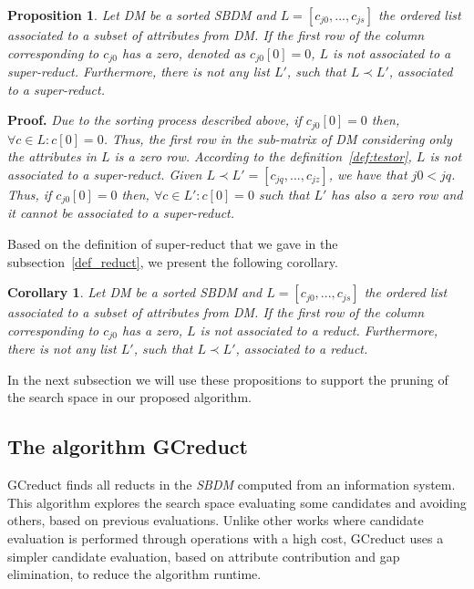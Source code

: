 \documentclass[number,preprint,review,12pt]{elsarticle}
\newtheorem{proposition}{Proposition}
\newtheorem{corollary}{Corollary}
\begin{document}
	\begin{proposition}\label{prop:firstRow}
		Let DM be a sorted SBDM and $L = [c_{j0},...,c_{js}]$ the ordered list associated to a subset of attributes from DM. If the first row of the column corresponding to $c_{j0}$ has a zero, denoted as $c_{j0}[0]=0$, $L$ is not associated to a super-reduct. Furthermore, there is not any list $L'$, such that $L\prec L'$, associated to a super-reduct.
	\end{proposition}
	
	\noindent
	\textbf{Proof.} \textit{Due to the sorting process described above, if $c_{j0}[0]=0$ then, $\forall c \in L: c[0]=0$. Thus, the first row in the sub-matrix of DM considering only the attributes in $L$ is a zero row. According to the definition~\ref{def:testor}, $L$ is not associated to a super-reduct. Given $L \prec L'= [c_{jq},...,c_{jz}]$, we have that $j0<jq$. Thus, if $c_{j0}[0]=0$ then, $\forall c \in L': c[0]=0$ such that $L'$ has also a zero row and it cannot be associated to a super-reduct.}

	Based on the definition of super-reduct that we gave in the subsection~\ref{def_reduct}, we present the following corollary.
	
	\begin{corollary}\label{coro:firstRow}
		Let DM be a sorted SBDM and $L = [c_{j0},...,c_{js}]$ the ordered list associated to a subset of attributes from DM. If the first row of the column corresponding to $c_{j0}$ has a zero, $L$ is not associated to a reduct. Furthermore, there is not any list $L'$, such that $L\prec L'$, associated to a reduct.
	\end{corollary}
	
	In the next subsection we will use these propositions to support the pruning of the search space in our proposed algorithm.

\subsection{The algorithm GCreduct}\label{description}
	GCreduct finds all reducts in the \textit{SBDM} computed from an information system. This algorithm explores the search space evaluating some candidates and avoiding others, based on previous evaluations. Unlike other works \citep{WangP07,Lias13} where candidate evaluation is performed through operations with a high cost, GCreduct uses a simpler candidate evaluation, based on attribute contribution and gap elimination, to reduce the algorithm runtime. 
	
\end{document}
